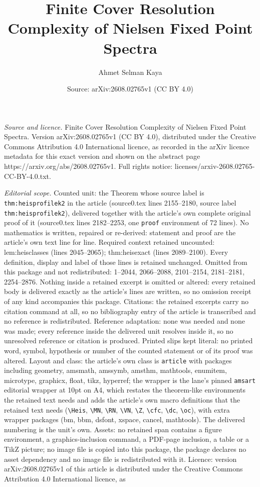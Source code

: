 \documentclass[10pt,a4paper]{amsart}
\title[Finite Cover Resolution Complexity of Nielsen Fixed Point Sp]{Finite Cover Resolution Complexity of Nielsen Fixed Point Spectra}
\author{Ahmet Selman Kaya}
\date{Source: arXiv:2608.02765v1 (CC BY 4.0)}
\begin{document}
\maketitle

\noindent\emph{Source and licence.} Finite Cover Resolution Complexity of Nielsen Fixed Point Spectra. Version arXiv:2608.02765v1 (CC BY 4.0), distributed under the Creative Commons Attribution 4.0 International licence, as recorded in the arXiv licence metadata for this exact version and shown on the abstract page https://arxiv.org/abs/2608.02765v1. Full rights notice: licenses/arxiv-2608.02765-CC-BY-4.0.txt.\par\smallskip

\noindent\textit{Editorial scope.} Counted unit: the Theorem whose source label is \texttt{thm:heisprofilek2} in the article (source0.tex lines 2155--2180, source label \texttt{thm:heisprofilek2}), delivered together with the article's own complete original proof of it (source0.tex lines 2182--2253, one \texttt{proof} environment of 72 lines). No mathematics is written, repaired or re-derived: statement and proof are the article's own text line for line. Required context retained uncounted: lem:heisclasses (lines 2045--2065); thm:heisexact (lines 2089--2100). Every definition, display and label of those lines is retained unchanged. Omitted from this package and not redistributed: 1--2044, 2066--2088, 2101--2154, 2181--2181, 2254--2876. Nothing inside a retained excerpt is omitted or altered: every retained body is delivered exactly as the article's lines are written, so no omission receipt of any kind accompanies this package. Citations: the retained excerpts carry no citation command at all, so no bibliography entry of the article is transcribed and no reference is redistributed. Reference adaptation: none was needed and none was made; every reference inside the delivered unit resolves inside it, so no unresolved reference or citation is produced. Printed slips kept literal: no printed word, symbol, hypothesis or number of the counted statement or of its proof was altered. Layout and class: the article's own class is \texttt{article} with packages including geometry, amsmath, amssymb, amsthm, mathtools, enumitem, microtype, graphicx, float, tikz, hyperref; the wrapper is the lane's pinned \texttt{amsart} editorial wrapper at 10pt on A4, which restates the theorem-like environments the retained text needs and adds the article's own macro definitions that the retained text needs (\texttt{\textbackslash Heis}, \texttt{\textbackslash MN}, \texttt{\textbackslash RN}, \texttt{\textbackslash VN}, \texttt{\textbackslash Z}, \texttt{\textbackslash cfc}, \texttt{\textbackslash dc}, \texttt{\textbackslash oc}), with extra wrapper packages (bm, bbm, dsfont, xspace, cancel, mathtools). The delivered numbering is the unit's own. Assets: no retained span contains a figure environment, a graphics-inclusion command, a PDF-page inclusion, a table or a TikZ picture; no image file is copied into this package, the package declares no asset dependency and no image file is redistributed with it. Licence: version arXiv:2608.02765v1 of this article is distributed under the Creative Commons Attribution 4.0 International licence, as 
\end{document}
